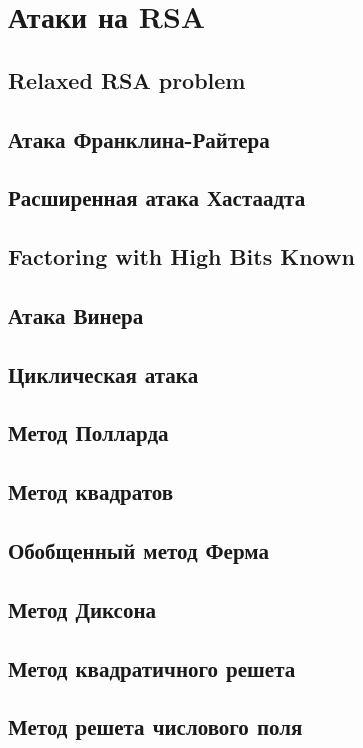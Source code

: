 \section{Атаки на RSA}

\subsection{Relaxed RSA problem}

\subsection{Атака Франклина-Райтера}

\subsection{Расширенная атака Хастаадта}

\subsection{Factoring with High Bits Known}

\subsection{Атака Винера}

\subsection{Циклическая атака}

\subsection{Метод Полларда}

\subsection{Метод квадратов}

\subsection{Обобщенный метод Ферма}

\subsection{Метод Диксона}

\subsection{Метод квадратичного решета}

\subsection{Метод решета числового поля}